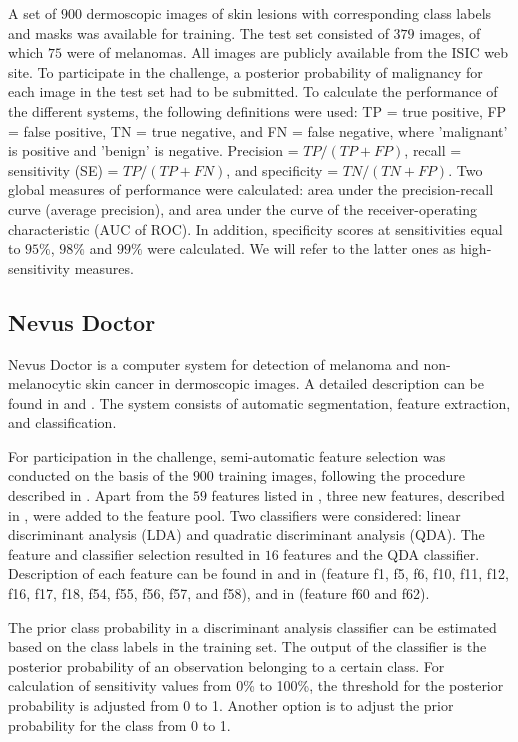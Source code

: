 \documentclass[a4paper,12pt]{article}
\begin{document}
A set of $900$ dermoscopic images of skin lesions with corresponding class labels and masks was available for training. 
The test set consisted of $379$ images, of which $75$ were of melanomas. 
All images are publicly available from the ISIC web site. 
To participate in the challenge, a posterior probability of malignancy for each image in the test set had to be submitted. 
To calculate the performance of the different systems, the following definitions were used: TP = true positive, FP = false positive, TN = true negative, and FN = false negative, where 'malignant' is positive and 'benign' is negative. 
Precision = $TP/(TP+FP)$, recall = sensitivity (SE) = $TP/(TP+FN)$, and specificity = $TN/(TN+FP)$. 
Two global measures of performance were calculated: area under the precision-recall curve (average precision), and area under the curve of the receiver-operating characteristic (AUC of ROC). 
In addition, specificity scores at sensitivities equal to $95\%$, $98\%$ and $99\%$ were calculated. 
We will refer to the latter ones as high-sensitivity measures. 

\subsection{Nevus Doctor} \label{sec:NevusDoctor}

Nevus Doctor is a computer system for detection of melanoma and non-melanocytic skin cancer in dermoscopic images. 
A detailed description can be found in \cite{Mollersen2015Improved} and \cite{Zortea2014Performance}. 
The system consists of automatic segmentation, feature extraction, and classification. 

For participation in the challenge, semi-automatic feature selection was conducted on the basis of the $900$ training images, following the procedure described in \cite{Mollersen2015Improved}. 
Apart from the $59$ features listed in \cite{Mollersen2015Improved}, three new features, described in \cite{Mollersen2015Divergencebased}, were added to the feature pool. 
Two classifiers were considered: linear discriminant analysis (LDA) and quadratic discriminant analysis (QDA). 
The feature and classifier selection resulted in $16$ features and the QDA classifier. 
Description of each feature can be found in \cite{Mollersen2015Improved} and in \cite{Zortea2014Performance} (feature f1, f5, f6, f10, f11, f12, f16, f17, f18, f54, f55, f56, f57, and f58), and in  \cite{Mollersen2015Divergencebased} (feature f60 and f62).

The prior class probability in a discriminant analysis classifier can be estimated based on the class labels in the training set. The output of the classifier is the posterior probability of an observation belonging to a certain class. For calculation of sensitivity values from 0\% to 100\%, the threshold for the posterior probability is adjusted from 0 to 1. Another option is to adjust the prior probability for the class from 0 to 1. 
\end{document}
